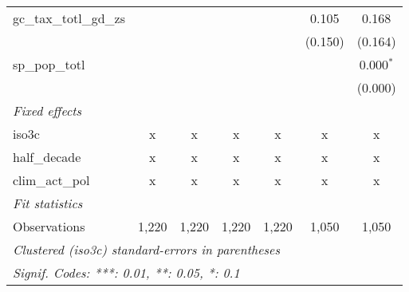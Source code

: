 \begin{tabular}{lcccccc}
   gc\_tax\_totl\_gd\_zs                                     &         &         &         &               & 0.105        & 0.168\\   
                                                             &         &         &         &               & (0.150)      & (0.164)\\   
   sp\_pop\_totl                                             &         &         &         &               &              & 0.000$^{*}$\\   
                                                             &         &         &         &               &              & (0.000)\\   
   \emph{Fixed effects}\\
   iso3c                                                     & x       & x       & x       & x             & x            & x\\  
   half\_decade                                              & x       & x       & x       & x             & x            & x\\  
   clim\_act\_pol                                            & x       & x       & x       & x             & x            & x\\  
   \midrule \emph{Fit statistics}\\
   Observations                                              & 1,220   & 1,220   & 1,220   & 1,220         & 1,050        & 1,050\\  
   \midrule
   \multicolumn{7}{l}{\emph{Clustered (iso3c) standard-errors in parentheses}}\\
   \multicolumn{7}{l}{\emph{Signif. Codes: ***: 0.01, **: 0.05, *: 0.1}}\\
\end{tabular}
\par\endgroup



